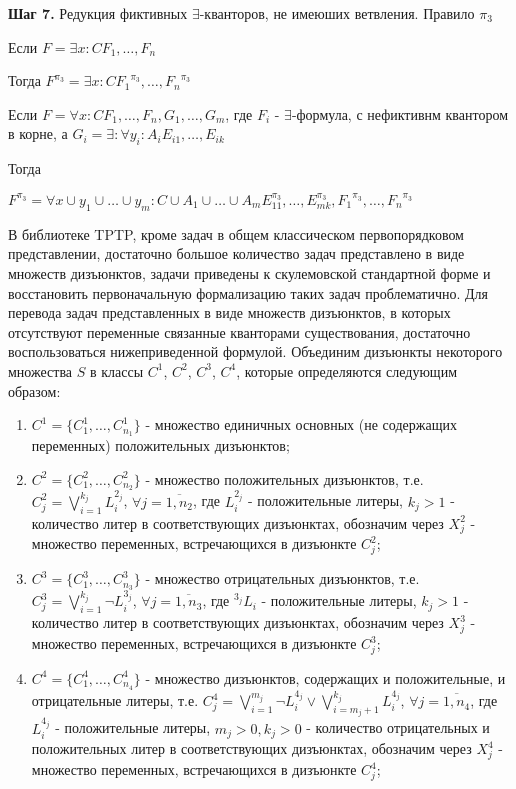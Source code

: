 \documentclass[a4paper]{jctart15b}
\begin{document}
\textbf{Шаг 7.} Редукция фиктивных $\exists$-кванторов, не имеюших ветвления. Правило $\pi_3$

Если
$F = \exists{x}\colon C F_1,\ldots,F_n$

Тогда
$F^{\pi_3} = \exists{x}\colon C {F_1}^{\pi_3},\ldots,{F_n}^{\pi_3}$

Если
$F = \forall{x}\colon C F_1,\ldots,F_n,G_1,\ldots,G_m$, где $F_i$ - $\exists$-формула, с нефиктивнм квантором в корне, а $G_i = \exists\colon\forall{y_i}\colon A_i E_{i1},\ldots,E_{ik}$

Тогда

$F^{\pi_3} = \forall{x \cup y_1 \cup\ldots\cup y_m}\colon C \cup A_1 \cup\ldots\cup A_m E_{11}^{\pi_3},\ldots,E_{mk}^{\pi_3},{F_1}^{\pi_3},\ldots,{F_n}^{\pi_3}$

\fi

В библиотеке TPTP, кроме задач в общем классическом первопорядковом представлении, достаточно большое количество задач представлено в виде множеств дизъюнктов, задачи приведены к скулемовской стандартной форме и восстановить первоначальную формализацию таких задач проблематично. Для перевода задач представленных в виде множеств дизъюнктов, в которых отсутствуют переменные связанные кванторами существования, достаточно воспользоваться нижеприведенной формулой. Объединим дизъюнкты некоторого множества $S$ в классы $C^1$, $C^2$, $C^3$, $C^4$, которые определяются следующим образом:

\begin{enumerate}
	\item $C^1 = \{ C^{1}_{1},\ldots, C^{1}_{n_1} \}$ - множество единичных основных (не содержащих переменных) положительных дизъюнктов;
	\item $C^2 = \{ C^{2}_{1},\ldots, C^{2}_{n_2} \}$ - множество положительных дизъюнктов, т.е. $C^{2}_{j} = \bigvee^{k_j}_{i=1} L^{2_j}_i$, $\forall j=\overline{1,n_2}$, где $L^{2_j}_i$ - положительные литеры, $k_j>1$ - количество литер в соответствующих дизъюнктах, обозначим через $X^2_j$ - множество переменных, встречающихся в дизъюнкте $C^2_j$;
	\item $C^3 = \{ C^{3}_{1},\ldots, C^{3}_{n_3} \}$ - множество отрицательных дизъюнктов, т.е. $C^{3}_{j} = \bigvee^{k_j}_{i=1}\neg L^{3_j}_i$, $\forall j=\overline{1,n_3}$, где $^{3_j}L_i$ - положительные литеры, $k_j>1$ - количество литер в соответствующих дизъюнктах, обозначим через $X^3_j$ - множество переменных, встречающихся в дизъюнкте $C^3_j$;
	\item $C^4 = \{ C^{4}_{1},\ldots, C^{4}_{n_4} \}$ - множество дизъюнктов, содержащих и положительные, и отрицательные литеры, т.е. $C^{4}_{j} = \bigvee^{m_j}_{i=1}\neg L^{4_j}_i\vee\bigvee^{k_j}_{i=m_{j}+1}L^{4_j}_i$, $\forall j=\overline{1,n_4}$, где $L^{4_j}_i$ - положительные литеры, $m_j>0, k_j>0$ - количество отрицательных и положительных литер в соответствующих дизъюнктах, обозначим через $X^4_j$ - множество переменных, встречающихся в дизъюнкте $C^4_j$;
\end{enumerate}
\end{document}
